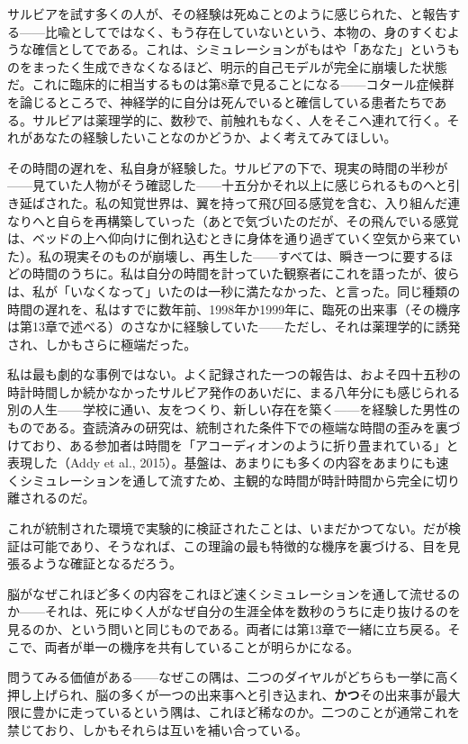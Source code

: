 \documentclass[11pt, twoside, openright]{book}
\begin{document}
サルビアを試す多くの人が、その経験は死ぬことのように感じられた、と報告する------比喩としてではなく、もう存在していないという、本物の、身のすくむような確信としてである。これは、シミュレーションがもはや「あなた」というものをまったく生成できなくなるほど、明示的自己モデルが完全に崩壊した状態だ。これに臨床的に相当するものは第8章で見ることになる------コタール症候群を論じるところで、神経学的に自分は死んでいると確信している患者たちである。サルビアは薬理学的に、数秒で、前触れもなく、人をそこへ連れて行く。それがあなたの経験したいことなのかどうか、よく考えてみてほしい。

その時間の遅れを、私自身が経験した。サルビアの下で、現実の時間の半秒が------見ていた人物がそう確認した------十五分かそれ以上に感じられるものへと引き延ばされた。私の知覚世界は、翼を持って飛び回る感覚を含む、入り組んだ連なりへと自らを再構築していった（あとで気づいたのだが、その飛んでいる感覚は、ベッドの上へ仰向けに倒れ込むときに身体を通り過ぎていく空気から来ていた）。私の現実そのものが崩壊し、再生した------すべては、瞬き一つに要するほどの時間のうちに。私は自分の時間を計っていた観察者にこれを語ったが、彼らは、私が「いなくなって」いたのは一秒に満たなかった、と言った。同じ種類の時間の遅れを、私はすでに数年前、1998年か1999年に、臨死の出来事（その機序は第13章で述べる）のさなかに経験していた------ただし、それは薬理学的に誘発され、しかもさらに極端だった。

私は最も劇的な事例ではない。よく記録された一つの報告は、およそ四十五秒の時計時間しか続かなかったサルビア発作のあいだに、まる八年分にも感じられる別の人生------学校に通い、友をつくり、新しい存在を築く------を経験した男性のものである。査読済みの研究は、統制された条件下での極端な時間の歪みを裏づけており、ある参加者は時間を「アコーディオンのように折り畳まれている」と表現した（Addy et al., 2015）。基盤は、あまりにも多くの内容をあまりにも速くシミュレーションを通して流すため、主観的な時間が時計時間から完全に切り離されるのだ。

これが統制された環境で実験的に検証されたことは、いまだかつてない。だが検証は可能であり、そうなれば、この理論の最も特徴的な機序を裏づける、目を見張るような確証となるだろう。

脳がなぜこれほど多くの内容をこれほど速くシミュレーションを通して流せるのか------それは、死にゆく人がなぜ自分の生涯全体を数秒のうちに走り抜けるのを見るのか、という問いと同じものである。両者には第13章で一緒に立ち戻る。そこで、両者が単一の機序を共有していることが明らかになる。

問うてみる価値がある------なぜこの隅は、二つのダイヤルがどちらも一挙に高く押し上げられ、脳の多くが一つの出来事へと引き込まれ、\textbf{かつ}その出来事が最大限に豊かに走っているという隅は、これほど稀なのか。二つのことが通常これを禁じており、しかもそれらは互いを補い合っている。
\end{document}
